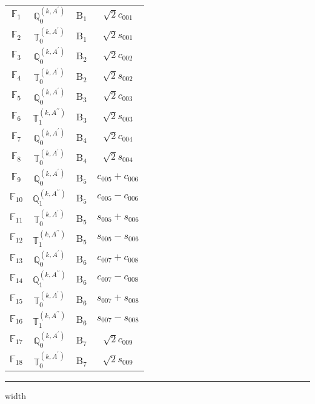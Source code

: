 \documentclass[fleqn,10pt,landscape]{article}
\begin{document}
\begin{itemize}
\begin{center}
\begin{longtable}{c|c|c|c}
$ \mathbb{F}_{1} $ & $\mathbb{Q}_{0}^{(k,A^{\prime})}$ & B$_{1}$ & $\sqrt{2} c_{001}$ \\
$ \mathbb{F}_{2} $ & $\mathbb{T}_{0}^{(k,A^{\prime})}$ & B$_{1}$ & $\sqrt{2} s_{001}$ \\ \hline
$ \mathbb{F}_{3} $ & $\mathbb{Q}_{0}^{(k,A^{\prime})}$ & B$_{2}$ & $\sqrt{2} c_{002}$ \\
$ \mathbb{F}_{4} $ & $\mathbb{T}_{0}^{(k,A^{\prime})}$ & B$_{2}$ & $\sqrt{2} s_{002}$ \\ \hline
$ \mathbb{F}_{5} $ & $\mathbb{Q}_{0}^{(k,A^{\prime})}$ & B$_{3}$ & $\sqrt{2} c_{003}$ \\
$ \mathbb{F}_{6} $ & $\mathbb{T}_{1}^{(k,A^{\prime\prime})}$ & B$_{3}$ & $\sqrt{2} s_{003}$ \\ \hline
$ \mathbb{F}_{7} $ & $\mathbb{Q}_{0}^{(k,A^{\prime})}$ & B$_{4}$ & $\sqrt{2} c_{004}$ \\
$ \mathbb{F}_{8} $ & $\mathbb{T}_{0}^{(k,A^{\prime})}$ & B$_{4}$ & $\sqrt{2} s_{004}$ \\ \hline
$ \mathbb{F}_{9} $ & $\mathbb{Q}_{0}^{(k,A^{\prime})}$ & B$_{5}$ & $c_{005} + c_{006}$ \\
$ \mathbb{F}_{10} $ & $\mathbb{Q}_{1}^{(k,A^{\prime\prime})}$ & B$_{5}$ & $c_{005} - c_{006}$ \\
$ \mathbb{F}_{11} $ & $\mathbb{T}_{0}^{(k,A^{\prime})}$ & B$_{5}$ & $s_{005} + s_{006}$ \\
$ \mathbb{F}_{12} $ & $\mathbb{T}_{1}^{(k,A^{\prime\prime})}$ & B$_{5}$ & $s_{005} - s_{006}$ \\ \hline
$ \mathbb{F}_{13} $ & $\mathbb{Q}_{0}^{(k,A^{\prime})}$ & B$_{6}$ & $c_{007} + c_{008}$ \\
$ \mathbb{F}_{14} $ & $\mathbb{Q}_{1}^{(k,A^{\prime\prime})}$ & B$_{6}$ & $c_{007} - c_{008}$ \\
$ \mathbb{F}_{15} $ & $\mathbb{T}_{0}^{(k,A^{\prime})}$ & B$_{6}$ & $s_{007} + s_{008}$ \\
$ \mathbb{F}_{16} $ & $\mathbb{T}_{1}^{(k,A^{\prime\prime})}$ & B$_{6}$ & $s_{007} - s_{008}$ \\ \hline
$ \mathbb{F}_{17} $ & $\mathbb{Q}_{0}^{(k,A^{\prime})}$ & B$_{7}$ & $\sqrt{2} c_{009}$ \\
$ \mathbb{F}_{18} $ & $\mathbb{T}_{0}^{(k,A^{\prime})}$ & B$_{7}$ & $\sqrt{2} s_{009}$ \\
\end{longtable}
\end{center}

 \hfil \hrule height 1mm width \textwidth \hfil


\end{itemize}
\end{document}
